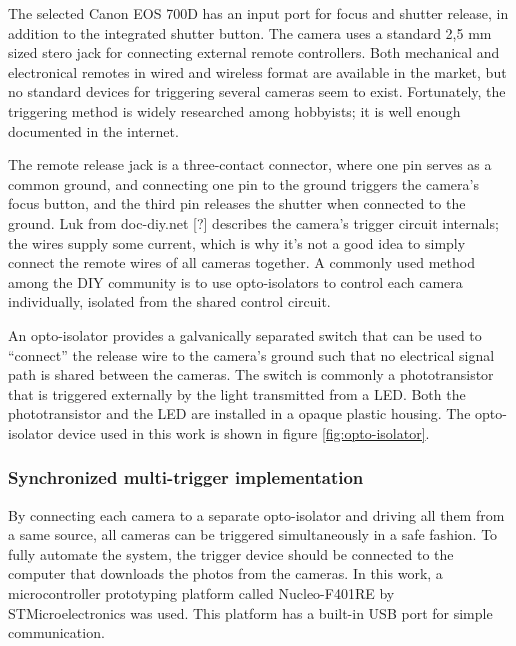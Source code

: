 The selected Canon EOS 700D has an input port for focus and shutter release, in addition to the integrated shutter button.
The camera uses a standard 2,5 mm sized stero jack for connecting external remote controllers.
Both mechanical and electronical remotes in wired and wireless format are available in the market, but no standard devices for triggering several cameras seem to exist.
Fortunately, the triggering method is widely researched among hobbyists; it is well enough documented in the internet.

The remote release jack is a three-contact connector, where one pin serves as a common ground, and connecting one pin to the ground triggers the camera's focus button, and the third pin releases the shutter when connected to the ground.
Luk from doc-diy.net [?] describes the camera's trigger circuit internals; the wires supply some current, which is why it's not a good idea to simply connect the remote wires of all cameras together.
A commonly used method among the DIY community is to use opto-isolators to control each camera individually, isolated from the shared control circuit.

An opto-isolator provides a galvanically separated switch that can be used to ``connect'' the release wire to the camera's ground such that no electrical signal path is shared between the cameras.
The switch is commonly a phototransistor that is triggered externally by the light transmitted from a LED.
Both the phototransistor and the LED are installed in a opaque plastic housing.
The opto-isolator device used in this work is shown in figure \ref{fig:opto-isolator}.



\subsubsection{Synchronized multi-trigger implementation} %

By connecting each camera to a separate opto-isolator and driving all them from a same source, all cameras can be triggered simultaneously in a safe fashion.
To fully automate the system, the trigger device should be connected to the computer that downloads the photos from the cameras.
In this work, a microcontroller prototyping platform called Nucleo-F401RE by STMicroelectronics was used.
This platform has a built-in USB port for simple communication.

